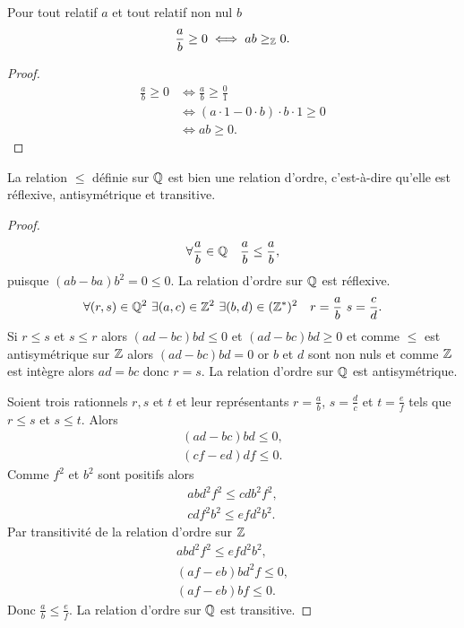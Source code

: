 \begin{prop}
  Pour tout relatif $a$ et tout relatif non nul $b$
  \begin{equation}
    \frac{a}{b} \geq 0 \iff ab \geq_{\mathbb{Z}} 0.
  \end{equation}
\end{prop}
\begin{proof}
  \begin{align}
    \frac{a}{b} \geq 0 &\iff \frac{a}{b} \geq \frac{0}{1} \\
    & \iff (a \cdot 1 - 0 \cdot b)\cdot b \cdot 1 \geq 0 \\
    & \iff ab \geq 0.
  \end{align}
\end{proof}
\begin{prop}
  La relation $\leq$ définie sur $\mathbb{Q}$ est bien une relation d'ordre, c'est-à-dire qu'elle est réflexive, antisymétrique et transitive.
\end{prop}
\begin{proof}
  \begin{equation}
    \forall \frac{a}{b} \in \mathbb{Q} \quad \frac{a}{b} \leq \frac{a}{b},
  \end{equation}
  puisque $(ab-ba)b^2=0 \leq 0$. La relation d'ordre sur $\mathbb{Q}$ est réflexive.
  \begin{equation}
    \forall (r,s) \in \Q^2 \ \exists (a,c) \in \Z^2 \ \exists (b,d) \in (\Z^*)^2 \quad r=\frac{a}{b} \ s=\frac{c}{d}.
  \end{equation}
  Si $r\leq s$ et $s \leq r$ alors $(ad-bc)bd \leq 0$ et $(ad-bc)bd \geq 0$ et comme $\leq$ est antisymétrique sur $\mathbb{Z}$ alors $(ad-bc)bd=0$ or $b$ et $d$ sont non nuls et comme $\mathbb{Z}$ est intègre alors $ad=bc$ donc $r=s$. La relation d'ordre sur $\mathbb{Q}$ est antisymétrique.

Soient trois rationnels $r,s$ et $t$ et leur représentants $r=\frac{a}{b}$, $s=\frac{d}{c}$ et $t=\frac{e}{f}$ tels que $r \leq s$ et $s \leq t$. Alors
\begin{align}
  (ad-bc)bd \leq 0, \\
  (cf-ed)df \leq 0.
\end{align}
Comme $f^2$ et $b^2$ sont positifs alors
\begin{align}
  abd^2f^2 \leq cdb^2f^2, \\
  cdf^2b^2 \leq efd^2b^2.
\end{align}
Par transitivité de la relation d'ordre sur $\mathbb{Z}$
\begin{align}
  abd^2f^2 \leq efd^2b^2, \\
  (af-eb)bd^2f \leq 0, \\
  (af-eb)bf \leq 0.
\end{align}
Donc $\frac{a}{b} \leq \frac{e}{f}$. La relation d'ordre sur $\mathbb{Q}$ est transitive.
\end{proof}
